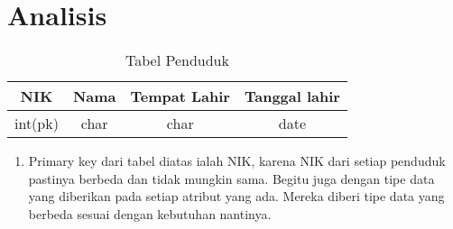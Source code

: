 \documentclass{article}
\begin{document}
\newpage
\section {Analisis}
\begin{table}[h]
\begin{center}
\begin{tabular}{|c|c|c|c|}
\hline
NIK & Nama & Tempat Lahir & Tanggal lahir\\
\hline
int(pk) & char & char & date\\
\hline
\end{tabular}
\caption{Tabel Penduduk}
\end{center}
\end{table}
\begin{enumerate}
\item Primary key dari tabel diatas ialah NIK, karena NIK dari setiap penduduk pastinya berbeda dan tidak mungkin sama. Begitu juga dengan tipe data yang diberikan pada setiap atribut yang ada. Mereka diberi tipe data yang berbeda sesuai dengan kebutuhan nantinya.


\end{enumerate}
\end{document}
